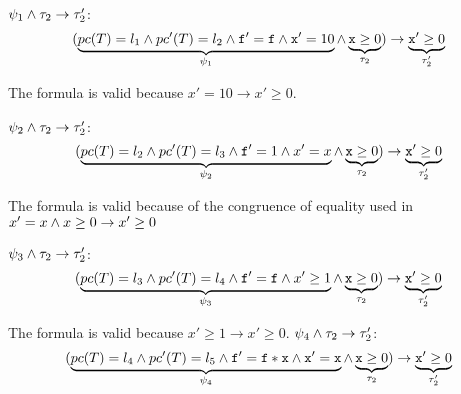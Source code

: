 	\; $\psi_1 \wedge \tau_2 \to \tau_2'$:	
	\begin{equation*}
		(
			\underbrace{pc(T) = l_1 \wedge pc'(T) = l_2 \wedge \mathtt{f'=f} \wedge \mathtt{x}' = 10}_{\psi_1} \wedge \underbrace{\mathtt{x} \geq 0}_{\tau_2}
		) 
				\to  \underbrace{\mathtt{x}' \geq 0}_{\tau_2'}\\\\
	\end{equation*}


	The formula is valid because $x'=10 \to x'\geq 0$.

	\; $\psi_2 \wedge \tau_2 \to \tau_2'$:	
	\begin{equation*}
		(
			\underbrace{pc(T) = l_2 \wedge pc'(T) = l_3 \wedge \mathtt{f}' = 1 \wedge x'=x}_{\psi_2} \wedge \underbrace{\mathtt{x} \geq 0}_{\tau_2}
		) 
			\to \underbrace{\mathtt{x}' \geq 0}_{\tau_2'}\\\\
	\end{equation*}



	The formula is valid because of the congruence of equality used in  $x'=x \wedge x\geq 0 \to x'\geq 0$ 

	\; $\psi_3 \wedge \tau_2 \to \tau_2'$:
	\begin{equation*}
		(
			\underbrace{pc(T) = l_3 \wedge pc'(T) = l_4 \wedge \mathtt{f'=f} \wedge x'\geq 1}_{\psi_3} \wedge \underbrace{\mathtt{x} \geq 0}_{\tau_2}
		) 
			\to \underbrace{\mathtt{x}' \geq 0}_{\tau_2'}\\\\
	\end{equation*}


	The formula is valid because $x'\geq 1 \to x'\geq 0$.
	\; $\psi_4 \wedge \tau_2 \to \tau_2'$:	
	\begin{equation*}
		(
			\underbrace{pc(T) = l_4 \wedge pc'(T) = l_5 \wedge \mathtt{f}' = \mathtt{f*x} \wedge \mathtt{x'=x}}_{\psi_4} \wedge \underbrace{\mathtt{x} \geq 0}_{\tau_2}
		) 
			\to \underbrace{\mathtt{x}' \geq 0}_{\tau_2'}\\\\
	\end{equation*}


